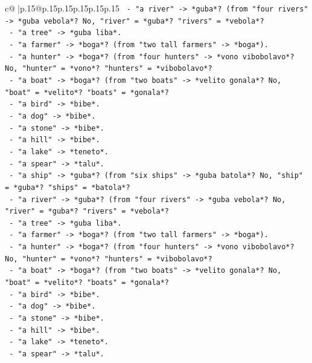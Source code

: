 \documentclass{article}
\begin{document}
{\begin{supertabular}{c@{$\;$}|p{.15\linewidth}@{}p{.15\linewidth}p{.15\linewidth}p{.15\linewidth}p{.15\linewidth}p{.15\linewidth}}
{{{\texttt{      {-} "a river" {-}> *guba*? (from "four rivers" {-}> *guba vebola*? No, "river" = *guba*? "rivers" = *vebola*?} \\
\texttt{      {-} "a tree" {-}> *guba liba*.} \\
\texttt{      {-} "a farmer" {-}> *boga*? (from "two tall farmers" {-}> *boga*).} \\
\texttt{      {-} "a hunter" {-}> *boga*? (from "four hunters" {-}> *vono vibobolavo*? No, "hunter" = *vono*? "hunters" = *vibobolavo*?} \\
\texttt{      {-} "a boat" {-}> *boga*? (from "two boats" {-}> *velito gonala*? No, "boat" = *velito*? "boats" = *gonala*?} \\
\texttt{      {-} "a bird" {-}> *bibe*.} \\
\texttt{      {-} "a dog" {-}> *bibe*.} \\
\texttt{      {-} "a stone" {-}> *bibe*.} \\
\texttt{      {-} "a hill" {-}> *bibe*.} \\
\texttt{      {-} "a lake" {-}> *teneto*.} \\
\texttt{      {-} "a spear" {-}> *talu*.} \\
\texttt{      {-} "a ship" {-}> *guba*? (from "six ships" {-}> *guba batola*? No, "ship" = *guba*? "ships" = *batola*?} \\
\texttt{      {-} "a river" {-}> *guba*? (from "four rivers" {-}> *guba vebola*? No, "river" = *guba*? "rivers" = *vebola*?} \\
\texttt{      {-} "a tree" {-}> *guba liba*.} \\
\texttt{      {-} "a farmer" {-}> *boga*? (from "two tall farmers" {-}> *boga*).} \\
\texttt{      {-} "a hunter" {-}> *boga*? (from "four hunters" {-}> *vono vibobolavo*? No, "hunter" = *vono*? "hunters" = *vibobolavo*?} \\
\texttt{      {-} "a boat" {-}> *boga*? (from "two boats" {-}> *velito gonala*? No, "boat" = *velito*? "boats" = *gonala*?} \\
\texttt{      {-} "a bird" {-}> *bibe*.} \\
\texttt{      {-} "a dog" {-}> *bibe*.} \\
\texttt{      {-} "a stone" {-}> *bibe*.} \\
\texttt{      {-} "a hill" {-}> *bibe*.} \\
\texttt{      {-} "a lake" {-}> *teneto*.} \\
\texttt{      {-} "a spear" {-}> *talu*.} \\
}}}
\end{supertabular}}
\end{document}
